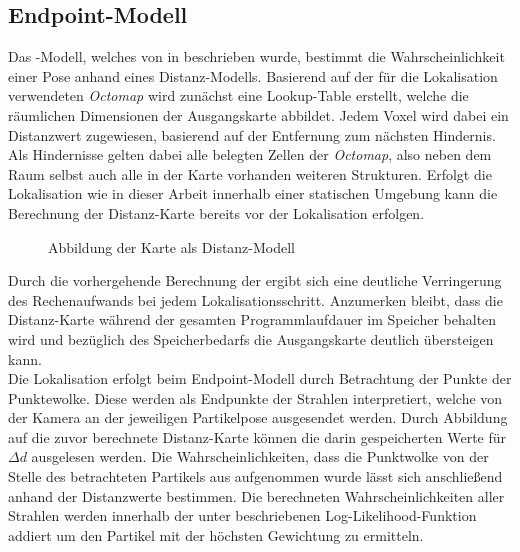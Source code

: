 
\subsection{Endpoint-Modell}
Das \red[Endpoint]-Modell, welches von \red[X] in \cite{Endpoint} beschrieben wurde, bestimmt die Wahrscheinlichkeit einer Pose anhand eines Distanz-Modells. Basierend auf der für die Lokalisation verwendeten \textit{Octomap} wird zunächst eine Lookup-Table erstellt, welche die räumlichen Dimensionen der Ausgangskarte abbildet. Jedem Voxel wird dabei ein Distanzwert zugewiesen, basierend auf der Entfernung zum nächsten Hindernis. Als Hindernisse gelten dabei alle belegten Zellen der \textit{Octomap}, also neben dem Raum selbst auch alle in der Karte vorhanden weiteren Strukturen. Erfolgt die Lokalisation wie in dieser Arbeit innerhalb einer statischen Umgebung kann die Berechnung der Distanz-Karte  bereits vor der Lokalisation erfolgen.\\

\begin{figure}[!ht]
	\begin{center}
	
	\hspace{5mm}
	\caption{Abbildung der Karte als Distanz-Modell}
	\label{fig.dist_map}
	\end{center}
\end{figure}

Durch die vorhergehende Berechnung der  ergibt sich eine deutliche Verringerung des Rechenaufwands bei jedem Lokalisationsschritt. Anzumerken bleibt, dass die Distanz-Karte während der gesamten Programmlaufdauer im Speicher behalten wird und bezüglich des Speicherbedarfs die Ausgangskarte deutlich übersteigen kann.\\

Die Lokalisation erfolgt beim Endpoint-Modell durch Betrachtung der Punkte der Punktewolke. Diese werden als Endpunkte der Strahlen interpretiert, welche von der Kamera an der jeweiligen Partikelpose ausgesendet werden. Durch Abbildung auf die zuvor berechnete Distanz-Karte können die darin gespeicherten Werte für $\Delta d$ ausgelesen werden. Die Wahrscheinlichkeiten, dass die Punktwolke von der Stelle des betrachteten Partikels aus aufgenommen wurde lässt sich anschließend anhand der Distanzwerte bestimmen. Die berechneten Wahrscheinlichkeiten aller Strahlen werden innerhalb der unter  beschriebenen Log-Likelihood-Funktion addiert um den Partikel mit der höchsten Gewichtung zu ermitteln.\\

